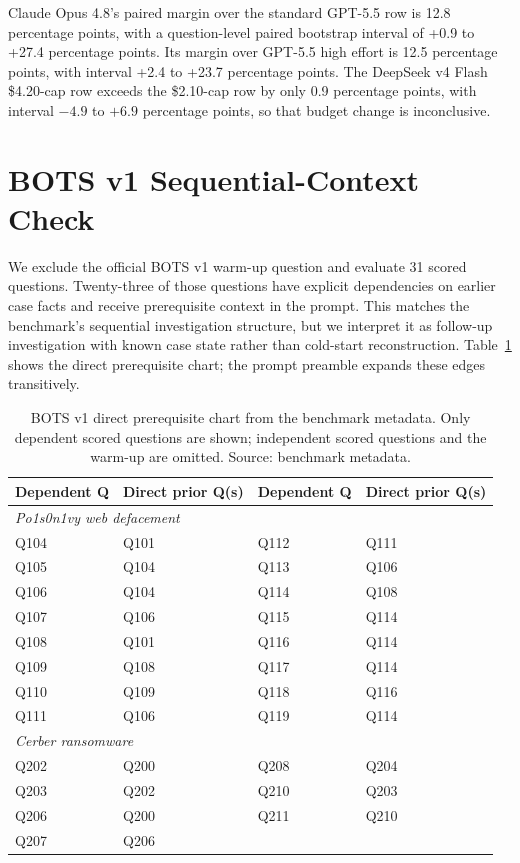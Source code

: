 \documentclass{jmlr}%
\begin{document}
Claude Opus 4.8's paired margin over the standard GPT-5.5 row is 12.8 percentage points, with a question-level paired bootstrap interval of +0.9 to +27.4 percentage points.
Its margin over GPT-5.5 high effort is 12.5 percentage points, with interval +2.4 to +23.7 percentage points.
The DeepSeek v4 Flash \$4.20-cap row exceeds the \$2.10-cap row by only 0.9 percentage points, with interval $-4.9$ to $+6.9$ percentage points, so that budget change is inconclusive.

\section{BOTS v1 Sequential-Context Check}
\label{app:bots-context}

We exclude the official BOTS v1 warm-up question and evaluate 31 scored questions.
Twenty-three of those questions have explicit dependencies on earlier case facts and receive prerequisite context in the prompt.
This matches the benchmark's sequential investigation structure, but we interpret it as follow-up investigation with known case state rather than cold-start reconstruction.
Table~\ref{tab:bots-dependencies} shows the direct prerequisite chart; the prompt preamble expands these edges transitively.

\begin{table}[!htbp]
\centering
\caption{BOTS v1 direct prerequisite chart from the benchmark metadata. Only dependent scored questions are shown; independent scored questions and the warm-up are omitted. Source: benchmark metadata.}
\label{tab:bots-dependencies}
\small
\begin{tabular*}{\linewidth}{@{\extracolsep{\fill}}llll@{}}
\toprule
Dependent Q & Direct prior Q(s) & Dependent Q & Direct prior Q(s) \\
\midrule
\multicolumn{4}{l}{\textit{Po1s0n1vy web defacement}} \\
Q104 & Q101 & Q112 & Q111 \\
Q105 & Q104 & Q113 & Q106 \\
Q106 & Q104 & Q114 & Q108 \\
Q107 & Q106 & Q115 & Q114 \\
Q108 & Q101 & Q116 & Q114 \\
Q109 & Q108 & Q117 & Q114 \\
Q110 & Q109 & Q118 & Q116 \\
Q111 & Q106 & Q119 & Q114 \\
\midrule
\multicolumn{4}{l}{\textit{Cerber ransomware}} \\
Q202 & Q200 & Q208 & Q204 \\
Q203 & Q202 & Q210 & Q203 \\
Q206 & Q200 & Q211 & Q210 \\
Q207 & Q206 & & \\
\bottomrule
\end{tabular*}
\end{table}
\FloatBarrier
\end{document}
